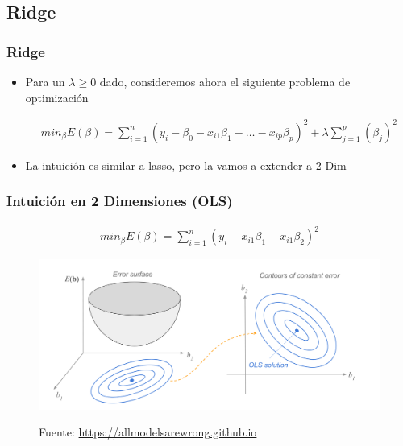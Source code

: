 \documentclass[
  shownotes,
  xcolor={svgnames},
  hyperref={colorlinks,citecolor=DarkBlue,linkcolor=DarkRed,urlcolor=DarkBlue}
  , aspectratio=169]{beamer}
\begin{document}
\subsection{Ridge}
\begin{frame}[fragile]
\frametitle{Ridge}

\begin{itemize}
\item Para un $\lambda \geq 0$ dado, consideremos ahora el siguiente problema de optimización


\begin{align}
min_{\beta} E(\beta) = \sum_{i=1}^n (y_i-\beta_0 - x_{i1}\beta_1 - \dots - x_{ip}\beta_p)^2 + \lambda \sum_{j=1}^p (\beta_j)^2
\end{align}

\bigskip
\item La intuición es similar a lasso, pero la vamos a extender a 2-Dim

\end{itemize}


\end{frame}
\begin{frame}[fragile]
\frametitle{Intuición en 2 Dimensiones (OLS)}

\begin{align}
min_{\beta} E(\beta) = \sum_{i=1}^n (y_i - x_{i1}\beta_1 - x_{i1}\beta_2)^2 
\end{align}
\begin{figure}[H] \centering
            \captionsetup{justification=centering}
              \includegraphics[scale=0.3]{figures/ols1}
 
\tiny
Fuente: \url{https://allmodelsarewrong.github.io}
\end{figure}


\end{frame}
\end{document}
